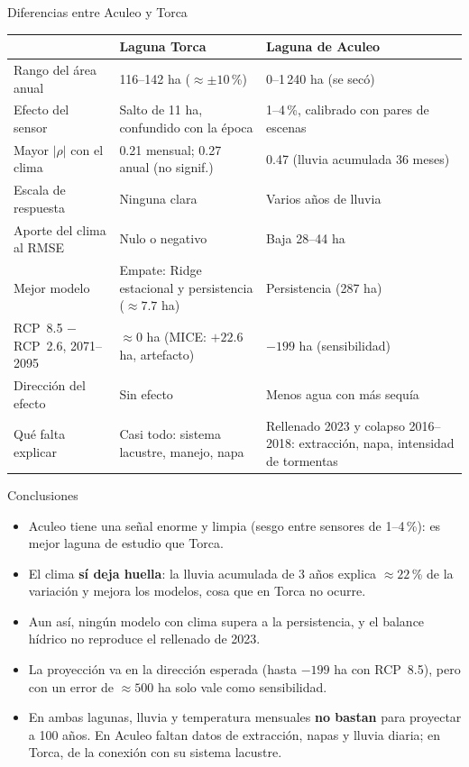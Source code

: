 \documentclass[10pt]{beamer}
\begin{document}
\begin{frame}{Diferencias entre Aculeo y Torca}
\centering
\footnotesize
\setlength{\tabcolsep}{4pt}
\renewcommand{\arraystretch}{1.15}
\begin{tabular}{L{2.6cm}L{4.0cm}L{4.0cm}}
\toprule
 & \textbf{Laguna Torca} & \textbf{Laguna de Aculeo} \\
\midrule
Rango del área anual & 116--142 ha (${\approx}\pm10$\,\%) & 0--1\,240 ha (se secó) \\
Efecto del sensor & Salto de 11 ha, confundido con la época & 1--4\,\%, calibrado con pares de escenas \\
Mayor $|\rho|$ con el clima & 0.21 mensual; 0.27 anual (no signif.) & 0.47 (lluvia acumulada 36 meses) \\
Escala de respuesta & Ninguna clara & Varios años de lluvia \\
Aporte del clima al RMSE & Nulo o negativo & Baja 28--44 ha \\
Mejor modelo & Empate: Ridge estacional y persistencia (${\approx}7.7$ ha) & Persistencia (287 ha) \\
RCP~8.5 $-$ RCP~2.6, 2071--2095 & ${\approx}0$ ha (MICE: $+22.6$ ha, artefacto) & $-199$ ha (sensibilidad) \\
Dirección del efecto & Sin efecto & Menos agua con más sequía \\
Qué falta explicar & Casi todo: sistema lacustre, manejo, napa & Rellenado 2023 y colapso 2016--2018: extracción, napa, intensidad de tormentas \\
\bottomrule
\end{tabular}
\end{frame}

\begin{frame}{Conclusiones}
\begin{itemize}
\item Aculeo tiene una señal enorme y limpia (sesgo entre sensores de 1--4\,\%): es mejor laguna de estudio que Torca.
\item El clima \textbf{sí deja huella}: la lluvia acumulada de 3 años explica ${\approx}22$\,\% de la variación y mejora los modelos, cosa que en Torca no ocurre.
\item Aun así, ningún modelo con clima supera a la persistencia, y el balance hídrico no reproduce el rellenado de 2023.
\item La proyección va en la dirección esperada (hasta $-199$ ha con RCP~8.5), pero con un error de ${\approx}500$ ha solo vale como sensibilidad.
\item En ambas lagunas, lluvia y temperatura mensuales \textbf{no bastan} para proyectar a 100 años. En Aculeo faltan datos de extracción, napas y lluvia diaria; en Torca, de la conexión con su sistema lacustre.
\end{itemize}
\end{frame}
\end{document}
